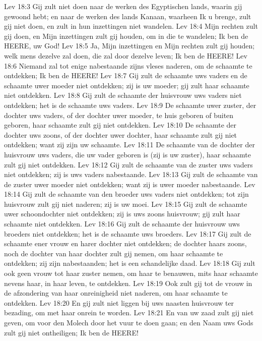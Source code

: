 Lev 18:3  Gij zult niet doen naar de werken des Egyptischen lands, waarin gij gewoond hebt; en naar de werken des lands Kanaan, waarheen Ik u brenge, zult gij niet doen, en zult in hun inzettingen niet wandelen.
Lev 18:4  Mijn rechten zult gij doen, en Mijn inzettingen zult gij houden, om in die te wandelen; Ik ben de HEERE, uw God!
Lev 18:5  Ja, Mijn inzettingen en Mijn rechten zult gij houden; welk mens dezelve zal doen, die zal door dezelve leven; Ik ben de HEERE!
Lev 18:6  Niemand zal tot enige nabestaande zijns vleses naderen, om de schaamte te ontdekken; Ik ben de HEERE!
Lev 18:7  Gij zult de schaamte uws vaders en de schaamte uwer moeder niet ontdekken; zij is uw moeder; gij zult haar schaamte niet ontdekken.
Lev 18:8  Gij zult de schaamte der huisvrouw uws vaders niet ontdekken; het is de schaamte uws vaders.
Lev 18:9  De schaamte uwer zuster, der dochter uws vaders, of der dochter uwer moeder, te huis geboren of buiten geboren, haar schaamte zult gij niet ontdekken.
Lev 18:10  De schaamte der dochter uws zoons, of der dochter uwer dochter, haar schaamte zult gij niet ontdekken; want zij zijn uw schaamte.
Lev 18:11  De schaamte van de dochter der huisvrouw uws vaders, die uw vader geboren is (zij is uw zuster), haar schaamte zult gij niet ontdekken.
Lev 18:12  Gij zult de schaamte van de zuster uws vaders niet ontdekken; zij is uws vaders nabestaande.
Lev 18:13  Gij zult de schaamte van de zuster uwer moeder niet ontdekken; want zij is uwer moeder nabestaande.
Lev 18:14  Gij zult de schaamte van den broeder uws vaders niet ontdekken; tot zijn huisvrouw zult gij niet naderen; zij is uw moei.
Lev 18:15  Gij zult de schaamte uwer schoondochter niet ontdekken; zij is uws zoons huisvrouw; gij zult haar schaamte niet ontdekken.
Lev 18:16  Gij zult de schaamte der huisvrouw uws broeders niet ontdekken; het is de schaamte uws broeders.
Lev 18:17  Gij zult de schaamte ener vrouw en harer dochter niet ontdekken; de dochter haars zoons, noch de dochter van haar dochter zult gij nemen, om haar schaamte te ontdekken; zij zijn nabestaanden; het is een schandelijke daad.
Lev 18:18  Gij zult ook geen vrouw tot haar zuster nemen, om haar te benauwen, mits haar schaamte nevens haar, in haar leven, te ontdekken.
Lev 18:19  Ook zult gij tot de vrouw in de afzondering van haar onreinigheid niet naderen, om haar schaamte te ontdekken.
Lev 18:20  En gij zult niet liggen bij uws naasten huisvrouw ter bezading, om met haar onrein te worden.
Lev 18:21  En van uw zaad zult gij niet geven, om voor den Molech door het vuur te doen gaan; en den Naam uws Gods zult gij niet ontheiligen; Ik ben de HEERE!
